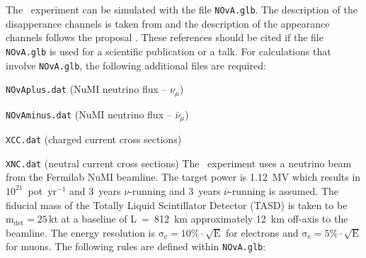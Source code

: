 The \NOVA\ experiment can be simulated with the file {\tt NOvA.glb}. The description of the disapperance 
channels is taken from \cite{Yang_2004} and the description of the appearance channels follows 
the proposal \cite{Ambats:2004js}. These references
should be cited if the file {\tt NOvA.glb} is used for a scientific publication or a talk. For calculations that
involve {\tt NOvA.glb}, the following additional files are required: 
\bi
\item {\tt NOvAplus.dat} (NuMI neutrino flux -- $\nu_\mu$)
\item {\tt NOvAminus.dat} (NuMI neutrino flux -- $\bar{\nu}_\mu$)
\item {\tt XCC.dat} (charged current cross sections)
\item {\tt XNC.dat} (neutral current cross sections)
\ei
The \NOVA\ experiment uses a neutrino beam from the Fermilab NuMI beamline. The target power is 
1.12~MV which results in $10^{21}$~pot~$\mathrm{yr^{-1}}$ and 3~years $\nu$-running and 3~years $\bar{\nu}$-running 
is assumed. The fiducial mass of the Totally Liquid Scintillator Detector (TASD) is taken to be 
$\mathrm{m_{det} = 25 \,kt}$ at a baseline of L~=~812~km approximately 12~km off-axis to the beamline. The
energy resolution is $\mathrm{\sigma_e=10 \% \cdot \sqrt{E}}$ for electrons and  $\mathrm{\sigma_e=5 \% \cdot \sqrt{E}}$
for muons. The following rules are defined within {\tt NOvA.glb}: 
